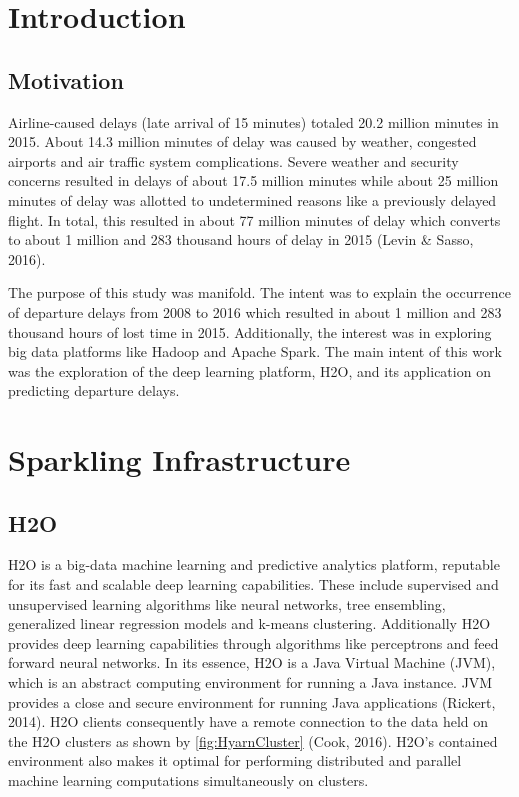 \documentclass[12pt,twoside]{amherstthesis}
\begin{document}
  
  \mainmatter %
  \pagestyle{fancyplain} %

  \chapter{Introduction}\label{introduction}
  
  \section{Motivation}\label{motivation}
  
  Airline-caused delays (late arrival of 15 minutes) totaled 20.2 million
  minutes in 2015. About 14.3 million minutes of delay was caused by
  weather, congested airports and air traffic system complications. Severe
  weather and security concerns resulted in delays of about 17.5 million
  minutes while about 25 million minutes of delay was allotted to
  undetermined reasons like a previously delayed flight. In total, this
  resulted in about 77 million minutes of delay which converts to about 1
  million and 283 thousand hours of delay in 2015 (Levin \& Sasso, 2016).
  
  The purpose of this study was manifold. The intent was to explain the
  occurrence of departure delays from 2008 to 2016 which resulted in about
  1 million and 283 thousand hours of lost time in 2015. Additionally, the
  interest was in exploring big data platforms like Hadoop and Apache
  Spark. The main intent of this work was the exploration of the deep
  learning platform, H2O, and its application on predicting departure
  delays.
  
  \chapter{Sparkling Infrastructure}\label{sparkling-infrastructure}
  
  \section{H2O}\label{h2o}
  
  H2O is a big-data machine learning and predictive analytics platform,
  reputable for its fast and scalable deep learning capabilities. These
  include supervised and unsupervised learning algorithms like neural
  networks, tree ensembling, generalized linear regression models and
  k-means clustering. Additionally H2O provides deep learning capabilities
  through algorithms like perceptrons and feed forward neural networks. In
  its essence, H2O is a Java Virtual Machine (JVM), which is an abstract
  computing environment for running a Java instance. JVM provides a close
  and secure environment for running Java applications (Rickert, 2014).
  H2O clients consequently have a remote connection to the data held on
  the H2O clusters as shown by \autoref{fig:HyarnCluster} (Cook, 2016).
  H2O's contained environment also makes it optimal for performing
  distributed and parallel machine learning computations simultaneously on
  clusters.
  
\end{document}
